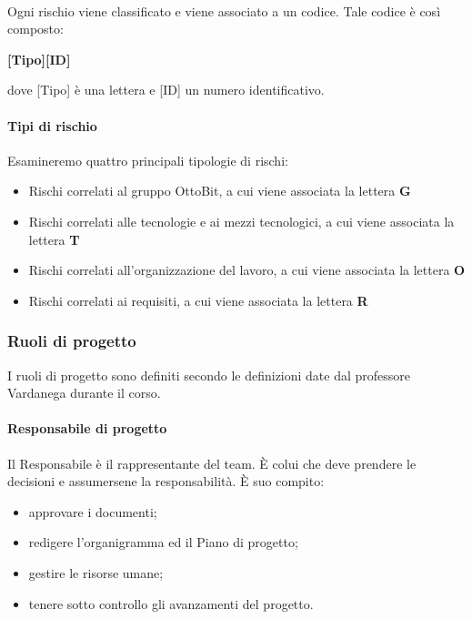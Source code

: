 \documentclass[11pt,a4paper]{article}
\begin{document}
{	
	
	\noindent \\
	Ogni rischio viene classificato e viene associato a un codice. Tale codice è così composto:
	\begin{center}
		\textbf{[Tipo][ID]}
	\end{center}
	dove [Tipo] è una lettera e [ID] un numero identificativo.\\
	
	\paragraph{Tipi di rischio\\}
	Esamineremo quattro principali tipologie di rischi:
	
	\begin{itemize}
		\item Rischi correlati al gruppo OttoBit, a cui viene associata la lettera \textbf{G}
		\item Rischi correlati alle tecnologie e ai mezzi tecnologici, a cui viene associata la lettera \textbf{T}
		\item Rischi correlati all'organizzazione del lavoro, a cui viene associata la lettera \textbf{O}
		\item Rischi correlati ai requisiti, a cui viene associata la lettera \textbf{R}
	\end{itemize}
	
	\subsubsection{Ruoli di progetto}
	I ruoli di progetto sono definiti secondo le definizioni date dal professore Vardanega durante il corso.
	\paragraph{Responsabile di progetto}
	Il Responsabile è il rappresentante del team. È colui che deve prendere le decisioni e assumersene la responsabilità.
	È suo compito:
	\begin{itemize}
		\item{approvare i documenti;}
		\item{redigere l'organigramma ed il Piano di progetto;}
		\item{gestire le risorse umane;}
		\item{tenere sotto controllo gli avanzamenti del progetto.}
	\end{itemize}
}
\end{document}
